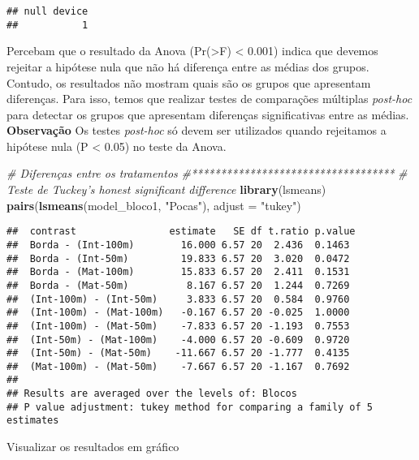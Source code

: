 \documentclass[
]{book}
\newenvironment{Shaded}{\begin{snugshade}}{\end{snugshade}}
\newcommand{\CommentTok}[1]{\textcolor[rgb]{0.56,0.35,0.01}{\textit{#1}}}
\newcommand{\DataTypeTok}[1]{\textcolor[rgb]{0.13,0.29,0.53}{#1}}
\newcommand{\KeywordTok}[1]{\textcolor[rgb]{0.13,0.29,0.53}{\textbf{#1}}}
\newcommand{\NormalTok}[1]{#1}
\newcommand{\StringTok}[1]{\textcolor[rgb]{0.31,0.60,0.02}{#1}}
\begin{document}
\begin{verbatim}
## null device 
##           1
\end{verbatim}

Percebam que o resultado da Anova (Pr(\textgreater F) \textless{} 0.001) indica que devemos rejeitar a hipótese nula que não há diferença entre as médias dos grupos. Contudo, os resultados não mostram quais são os grupos que apresentam diferenças. Para isso, temos que realizar testes de comparações múltiplas \emph{post-hoc} para detectar os grupos que apresentam diferenças significativas entre as médias. \textbf{Observação} Os testes \emph{post-hoc} só devem ser utilizados quando rejeitamos a hipótese nula (P \textless{} 0.05) no teste da Anova.

\begin{Shaded}
\begin{Highlighting}[]
\CommentTok{# Diferenças entre os tratamentos}
\CommentTok{#***********************************}
\CommentTok{# Teste de Tuckey's honest significant difference}
\KeywordTok{library}\NormalTok{(lsmeans)}
\KeywordTok{pairs}\NormalTok{(}\KeywordTok{lsmeans}\NormalTok{(model_bloco1, }\StringTok{"Pocas"}\NormalTok{), }\DataTypeTok{adjust =} \StringTok{"tukey"}\NormalTok{)}
\end{Highlighting}
\end{Shaded}

\begin{verbatim}
##  contrast                estimate   SE df t.ratio p.value
##  Borda - (Int-100m)        16.000 6.57 20  2.436  0.1463 
##  Borda - (Int-50m)         19.833 6.57 20  3.020  0.0472 
##  Borda - (Mat-100m)        15.833 6.57 20  2.411  0.1531 
##  Borda - (Mat-50m)          8.167 6.57 20  1.244  0.7269 
##  (Int-100m) - (Int-50m)     3.833 6.57 20  0.584  0.9760 
##  (Int-100m) - (Mat-100m)   -0.167 6.57 20 -0.025  1.0000 
##  (Int-100m) - (Mat-50m)    -7.833 6.57 20 -1.193  0.7553 
##  (Int-50m) - (Mat-100m)    -4.000 6.57 20 -0.609  0.9720 
##  (Int-50m) - (Mat-50m)    -11.667 6.57 20 -1.777  0.4135 
##  (Mat-100m) - (Mat-50m)    -7.667 6.57 20 -1.167  0.7692 
## 
## Results are averaged over the levels of: Blocos 
## P value adjustment: tukey method for comparing a family of 5 estimates
\end{verbatim}

Visualizar os resultados em gráfico
\end{document}
